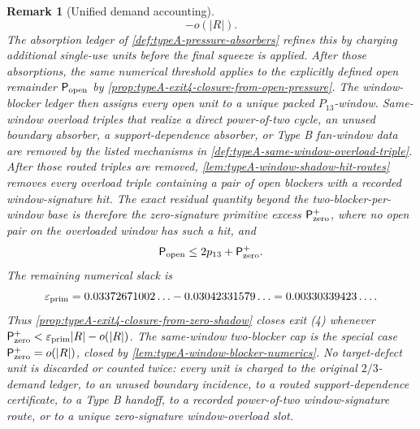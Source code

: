 \documentclass[11pt]{article}
\newtheorem{remark}[theorem]{Remark}
\begin{document}
\begin{remark}[Unified demand accounting]
\[-o(|R|).
\]
The absorption ledger of \cref{def:typeA-pressure-absorbers} refines this by
charging additional single-use units before the final squeeze is applied.
After those absorptions, the same numerical threshold applies to the explicitly
defined open remainder \(\mathsf P_{\rm open}\) by
\cref{prop:typeA-exit4-closure-from-open-pressure}.  The window-blocker ledger
then assigns every open unit to a unique packed \(P_{13}\)-window.  Same-window
overload triples that realize a direct power-of-two cycle, an unused boundary
absorber, a support-dependence absorber, or Type B
fan-window data are removed by the listed mechanisms in
\cref{def:typeA-same-window-overload-triple}.  After those routed triples are
removed, \cref{lem:typeA-window-shadow-hit-routes} removes every overload
triple containing a pair of open blockers with a recorded window-signature hit.
The exact residual quantity beyond the two-blocker-per-window base is therefore
the zero-signature primitive excess \(\mathsf P_{\rm zero}^{+}\), where no open
pair on the overloaded window has such a hit, and
\[
\mathsf P_{\rm open}\le2p_{13}+\mathsf P_{\rm zero}^{+}.
\]
The remaining numerical slack is
\[
\varepsilon_{\rm prim}
=
0.03372671002\ldots-0.03042331579\ldots
=0.00330339423\ldots .
\]
Thus \cref{prop:typeA-exit4-closure-from-zero-shadow} closes exit
\textup{(4)} whenever
\(\mathsf P_{\rm zero}^{+}<\varepsilon_{\rm prim}|R|-o(|R|)\).  The
same-window two-blocker cap is the special case
\(\mathsf P_{\rm zero}^{+}=o(|R|)\), closed by
\cref{lem:typeA-window-blocker-numerics}.  No target-defect unit is discarded
or counted twice: every unit is charged to the original \(2/3\)-demand
ledger, to an unused boundary incidence, to a routed support-dependence
certificate, to a Type B handoff, to a recorded power-of-two
window-signature route, or to a unique zero-signature window-overload slot.
\end{remark}
\end{document}
